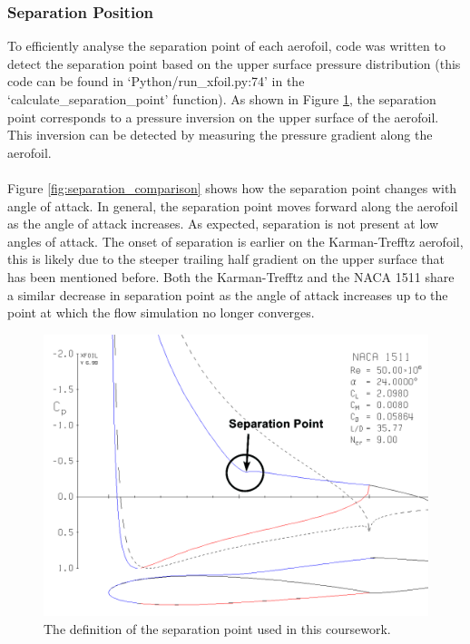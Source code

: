 \documentclass[10pt,a4paper]{article}
\begin{document}
\subsubsection{Separation Position}
To efficiently analyse the separation point of each aerofoil, code was written to detect the separation point based on the upper surface pressure distribution (this code can be found in `Python/run\_xfoil.py:74' in the `calculate\_separation\_point' function). As shown in Figure \ref{fig:separation_point}, the separation point corresponds to a pressure inversion on the upper surface of the aerofoil. This inversion can be detected by measuring the pressure gradient along the aerofoil.
\\\\Figure \ref{fig:separation_comparison} shows how the separation point changes with angle of attack. In general, the separation point moves forward along the aerofoil as the angle of attack increases. As expected, separation is not present at low angles of attack. The onset of separation is earlier on the Karman-Trefftz aerofoil, this is likely due to the steeper trailing half gradient on the upper surface that has been mentioned before. Both the Karman-Trefftz and the NACA 1511 share a similar decrease in separation point as the angle of attack increases up to the point at which the flow simulation no longer converges.
\begin{figure}[!htb]
\centering
\includegraphics[scale=0.35]{Figures/separation_point.png}
\caption{The definition of the separation point used in this coursework.}
\label{fig:separation_point}
\end{figure}
\end{document}
